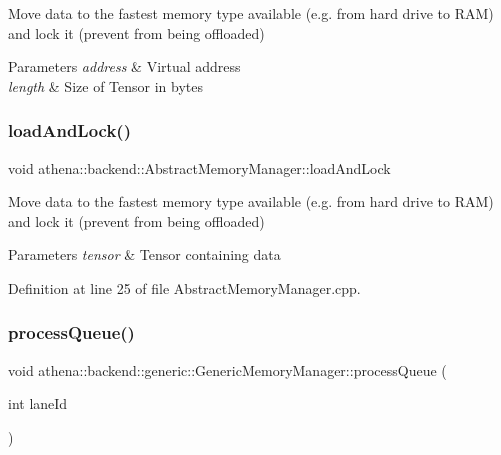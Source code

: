 Move data to the fastest memory type available (e.\+g. from hard drive to R\+AM) and lock it (prevent from being offloaded) 
\begin{DoxyParams}{Parameters}
{\em address} & Virtual address \\
\hline
{\em length} & Size of Tensor in bytes \\
\hline
\end{DoxyParams}
\mbox{\label{classathena_1_1backend_1_1generic_1_1_generic_memory_manager_a2bbfba2a5104aab3068d46214a6ae7df}} 
\subsubsection{\texorpdfstring{load\+And\+Lock()}{loadAndLock()}\hspace{0.1cm}{\footnotesize\ttfamily [4/4]}}
{\footnotesize\ttfamily void athena\+::backend\+::\+Abstract\+Memory\+Manager\+::load\+And\+Lock}

Move data to the fastest memory type available (e.\+g. from hard drive to R\+AM) and lock it (prevent from being offloaded) 
\begin{DoxyParams}{Parameters}
{\em tensor} & Tensor containing data \\
\hline
\end{DoxyParams}


Definition at line 25 of file Abstract\+Memory\+Manager.\+cpp.

\mbox{\label{classathena_1_1backend_1_1generic_1_1_generic_memory_manager_a978be661a46caaa8f6ef40a2c45a014e}} 
\subsubsection{\texorpdfstring{process\+Queue()}{processQueue()}}
{\footnotesize\ttfamily void athena\+::backend\+::generic\+::\+Generic\+Memory\+Manager\+::process\+Queue (\begin{DoxyParamCaption}\item[{int}]{lane\+Id }\end{DoxyParamCaption})\hspace{0.3cm}{\ttfamily [protected]}}

